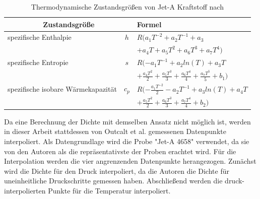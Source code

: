 \begin{table}[ht]
	\centering
	\caption{Thermodynamische Zustandsgrößen von Jet-A Kraftstoff nach 
		\cite{McBridge.2002}}
	\begin{tabular} {|l|c|l|} \hline%
		\multicolumn{2}{|c|}{Zustandsgröße}  & Formel\\ \hline\hline%
		spezifische Enthalpie &$h$ & $R(a_1T^{-2}+a_2T^{-1} +a_3$ \\ 
		& & $+a_4T+a_5T^2+a_6T^3+a_7T^4)$\\ \hline
		spezifische Entropie& $s$ &  $R(-a_1T^{-1}+a_2ln(T)+a_3T$\\ 
		& & $+\frac{a_4T^2}{2}+\frac{a_5T^3}{3}+\frac{a_6T^4}{4}+\frac{a_7T^5}{5}+b_1)$\\ \hline
		spezifische isobare Wärmekapazität &$c_p$ &  $R(-\frac{a_1T^{-2}}{2}-a_2T^{-1}+a_3ln(T)+ a_4T$\\ 
		& & $+\frac{a_5T^{2}}{2}+\frac{a_6T^{3}}{3}+\frac{a_7T^{4}}{4}+b_2)$\\ \hline
	\end{tabular}	
	\label{Tab:thermodynamic_properties_jeta}%
\end{table}
\FloatBarrier 

Da eine Berechnung der Dichte mit demselben Ansatz nicht möglich ist, werden in dieser Arbeit stattdessen von Outcalt et al. \cite{Outcalt.2009} gemessenen Datenpunkte interpoliert. Als Datengrundlage wird die Probe "Jet-A 4658" verwendet, da sie von den Autoren als die repräsentativste der Proben erachtet wird. Für die Interpolation werden die vier angrenzenden Datenpunkte herangezogen. Zunächst wird die Dichte für den Druck interpoliert, da die Autoren die Dichte für uneinheitliche Druckschritte gemessen haben. Abschließend werden die druck-interpolierten Punkte für die Temperatur interpoliert. 




